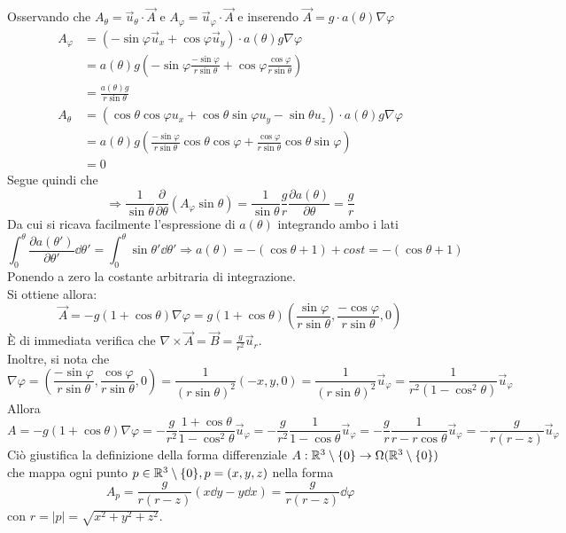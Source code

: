 Osservando che $A_\theta = \vec u _\theta \cdot \vec A $ e
$A_\varphi = \vec u _\varphi \cdot \vec A$ e inserendo $ \vec A = g \cdot a(\theta) \nabla \varphi $
\begin{equation*}
   \begin{aligned}
         A_\varphi & = (-\sin\varphi \vec u _x + \cos\varphi \vec u _y)
                       \cdot a(\theta) g \nabla \varphi \\
                   & = a(\theta)g\left( -\sin\varphi \frac{-\sin\varphi}{r\sin\theta}
                      + \cos\varphi \frac{\cos\varphi}{r\sin\theta}\right)\\
                   & = \frac{a(\theta)g}{r\sin\theta} \\
        A_\theta & = (\cos\theta \cos\varphi u_x + \cos\theta \sin\varphi u_y
                          - \sin\theta u_z) \cdot a(\theta) g \nabla \varphi \\
                 & = a(\theta) g \left( \frac{-\sin\varphi}{r\sin\theta} \cos\theta \cos\varphi
                          + \frac{\cos\varphi}{r\sin\theta} \cos\theta \sin\varphi \right) \\
                 & = 0
   \end{aligned}
\end{equation*}
Segue quindi che
$$
   \Rightarrow
   \frac{1}{\sin\theta} \frac{\partial}{\partial\theta}(A_\varphi \sin\theta)
      = \frac{1}{\sin\theta} \frac{g}{r} \frac{\partial a(\theta)}{\partial \theta}
      = \frac{g}{r}
$$
Da cui si ricava facilmente l'espressione di $a(\theta)$ integrando ambo i lati
$$
   \int_0 ^\theta \frac{\partial a(\theta')}{\partial \theta'} \dd \theta'
      = \int_0^\theta \sin\theta' \dd \theta'
   \Rightarrow a(\theta) = -(\cos\theta+1) + cost  = -(\cos\theta+1)
$$
Ponendo a zero la costante arbitraria di integrazione.\\
%
Si ottiene allora:
$$
   \boxed{
          \vec A = -g(1 + \cos\theta) \nabla \varphi
                 = g(1 + \cos\theta)\left( \frac{\sin\varphi}{r\sin\theta},
                    \frac{-\cos\varphi}{r\sin\theta},0 \right)
   }
$$
È di immediata verifica che $\nabla \times \vec A = \vec B = \frac{g}{r^2} \vec u _r$.\\
%
Inoltre, si nota che
$$
   \nabla \varphi = \left( \frac{-\sin\varphi}{r\sin\theta},\frac{\cos\varphi}{r\sin\theta},0 \right)
      = \frac{1}{(r\sin\theta)^2}(-x,y,0) = \frac{1}{(r\sin\theta)^2}\vec u _\varphi
      = \frac{1}{r^2(1-\cos^2\theta)} \vec u _\varphi
$$
Allora
$$
   A = -g(1+\cos\theta)\nabla\varphi = -\frac{g}{r^2} \frac{1+\cos\theta}{1-\cos^2\theta} \vec u _\varphi
     = -\frac{g}{r^2} \frac{1}{1-\cos\theta} \vec u _\varphi
     = -\frac{g}{r} \frac{1}{r-r\cos\theta} \vec u _\varphi
     = -\frac{g}{r(r-z)} \vec u _\varphi
$$
Ciò giustifica la definizione della forma differenziale $ A : \mathbb{R}^3 \setminus \{0\}
\to \Omega(\mathbb{R}^3 \setminus \{0\})$ che mappa ogni punto $p \in \mathbb{R}^3 \setminus \{0\} , p = (x,y,z)$ nella forma
$$
    A_p = \frac{g}{r(r-z)}(x \dd  y - y \dd  x) = \frac{g}{r(r-z)} \dd  \varphi
$$
con $r = |p| = \sqrt{x^2+y^2+z^2}$.


